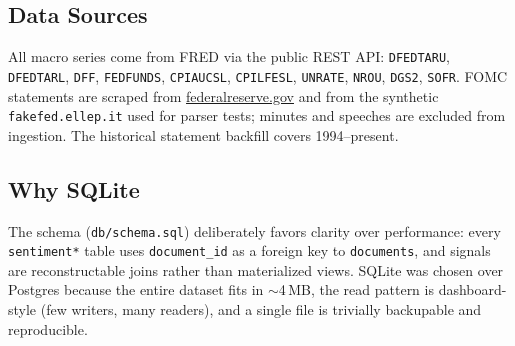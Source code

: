 \subsection{Data Sources}
All macro series come from FRED via the public REST API: \texttt{DFEDTARU}, \texttt{DFEDTARL}, \texttt{DFF}, \texttt{FEDFUNDS}, \texttt{CPIAUCSL}, \texttt{CPILFESL}, \texttt{UNRATE}, \texttt{NROU}, \texttt{DGS2}, \texttt{SOFR}. FOMC statements are scraped from \url{federalreserve.gov} and from the synthetic \texttt{fakefed.ellep.it} used for parser tests; minutes and speeches are excluded from ingestion. The historical statement backfill covers 1994--present.

\subsection{Why SQLite}
The schema (\texttt{db/schema.sql}) deliberately favors clarity over performance: every \texttt{sentiment*} table uses \texttt{document\_id} as a foreign key to \texttt{documents}, and signals are reconstructable joins rather than materialized views. SQLite was chosen over Postgres because the entire dataset fits in $\sim$4\,MB, the read pattern is dashboard-style (few writers, many readers), and a single file is trivially backupable and reproducible.
